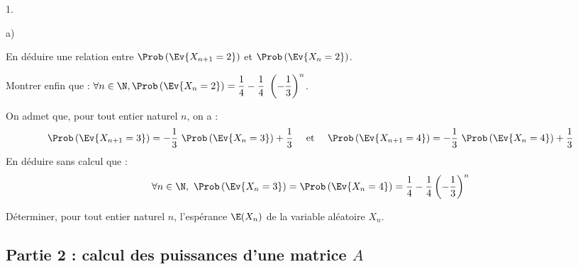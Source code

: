 \documentclass[11pt]{article}%
\begin{document}
\begin{noliste}{1.}
\begin{noliste}{a)}
    

  \item En déduire une relation entre $\Prob\left(\Ev{X_{n + 1} =
        2}\right)$ et $\Prob\left(\Ev{X_{n} = 2}\right)$.

    




  \item Montrer enfin que : $\forall n \in \N, \Prob\left(\Ev{X_{n} =
        2}\right) = \dfrac{1}{4} - \dfrac{1}{4} \
    \left(-\dfrac{1}{3}\right)^{n}$.

    

  \end{noliste}
  
\item On admet que, pour tout entier naturel $n$, on a :
  \[
  \Prob\left(\Ev{X_{n + 1} = 3}\right) = -\dfrac{1}{3} \ 
  \Prob\left(\Ev{X_{n} = 3}\right) + \dfrac{1}{3} \quad \hbox{ et }
  \quad \Prob\left(\Ev{X_{n + 1} = 4}\right) = -\dfrac{1}{3} \ 
  \Prob\left(\Ev{X_{n} = 4}\right) + \dfrac{1}{3}
  \]
  En déduire sans calcul que :
  \[
  \forall n \in \N, \ \Prob\left(\Ev{X_{n} = 3}\right) =
  \Prob\left(\Ev{X_{n} = 4}\right) =
  \dfrac{1}{4}-\dfrac{1}{4}\left(-\dfrac{1}{3}\right)^{n}
  \]

  



  
\item Déterminer, pour tout entier naturel $n$, l'espérance
  $\E(X_{n})$ de la variable aléatoire $X_{n}$.

  

\end{noliste}

\subsection*{Partie 2 : calcul des puissances d'une matrice $A$}
\end{document}
